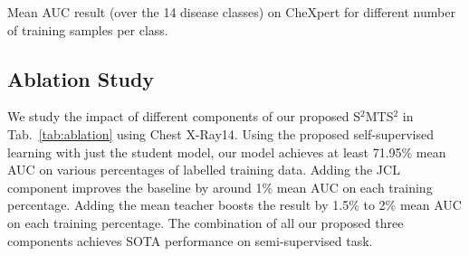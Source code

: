 \documentclass[runningheads]{llncs}
\begin{document}
\vspace{-.2in}
\begin{table}[t!]
    \begin{minipage}{.5\textwidth}
      \centering
      \caption{Mean AUC result (over the 14 disease classes) on CheXpert for different number of training samples per class.}
      \label{tab:chexpert}
    \end{minipage}
    \begin{minipage}{.5\textwidth}
      \centering
      \caption{AUC, Sensitivity and F1 result on ISIC2018 using 20\% of labelled training samples.}
      \vspace{-.2in}
      \label{tab:isic}
    \end{minipage}
  \end{table}


\subsection{Ablation Study}

We study the impact of different components of our proposed S$^2$MTS$^2$ in Tab.~\ref{tab:ablation} using Chest X-Ray14. Using the proposed self-supervised learning with just the student model, our model achieves at least 71.95\% mean AUC on various percentages of labelled training data. Adding the JCL component improves the baseline by around 1\% mean AUC on each training percentage. Adding the mean teacher boosts the result by 1.5\% to 2\% mean AUC on each training percentage.
The combination of all our proposed three components achieves SOTA performance on semi-supervised task.
\end{document}
